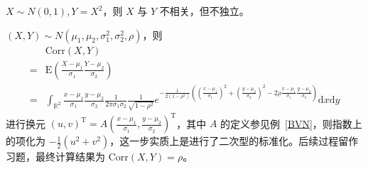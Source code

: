 \documentclass[../main.tex]{subfiles}
\begin{document}
\begin{example}
    $X\sim N(0,1),Y=X^2$，则 $X$ 与 $Y$ 不相关，但不独立。
\end{example}

\begin{example}
    $(X,Y)\sim N(\mu_1,\mu_2,\sigma_1^2,\sigma_2^2,\rho)$，则
    \begin{equation*}
        \begin{aligned}
              & \mathrm{Corr}(X,Y)                                                                                                                                                                                                                                                                       \\
            = & \mathrm E(\frac{X-\mu_1}{\sigma_1}\frac{Y-\mu_2}{\sigma_2})                                                                                                                                                                                                                              \\
            = & \int_{\mathbb R^2}\frac{x-\mu_1}{\sigma_1}\frac{y-\mu_2}{\sigma_2}\frac{1}{2\pi\sigma_1\sigma_2}\frac{1}{\sqrt{1-\rho^2}}e^{-\frac{1}{2(1-\rho^2)}((\frac{x-\mu_1}{\sigma_1})^2+(\frac{y-\mu_2}{\sigma_2})^2-2\rho\frac{x-\mu_1}{\sigma_1}\frac{y-\mu_2}{\sigma_2})}\mathrm dx\mathrm dy
        \end{aligned}
    \end{equation*}
    进行换元 $(u,v)^\mathrm T=A(\frac{x-\mu_1}{\sigma_1},\frac{y-\mu_2}{\sigma_2})^\mathrm T$，其中 $A$ 的定义参见例~\ref{BVN}，则指数上的项化为 $-\frac12(u^2+v^2)$，这一步实质上是进行了二次型的标准化。后续过程留作习题，最终计算结果为 $\mathrm{Corr}(X,Y)=\rho$。
\end{example}
\end{document}
